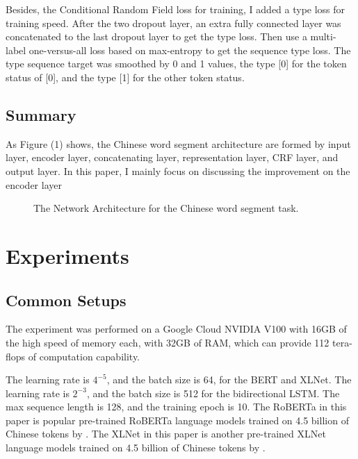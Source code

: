 \documentclass[11pt,a4paper]{article}
\begin{document}
Besides, the Conditional Random Field loss for training, I added a type loss for training speed.
After the two dropout layer, an extra fully connected layer was concatenated to the last dropout layer to get the type loss.
Then use a multi-label one-versus-all loss based on max-entropy to get the sequence type loss.
The type sequence target was smoothed by 0 and 1 values, the type [0] for the token status of [0], and the type [1] for the other token status.

\subsection{Summary}

As Figure (1) shows, the Chinese word segment architecture are formed by input layer, encoder layer, concatenating layer, representation layer, CRF layer, and output layer.
In this paper, I mainly focus on discussing the improvement on the encoder layer
\begin{figure*}
\begin{center}
\end{center}
   \caption{The Network Architecture for the Chinese word segment task.}
\label{fig:short}
\end{figure*}

\section{Experiments}

\subsection{Common Setups}

\par The experiment was performed on a Google Cloud NVIDIA V100 with 16GB of the high speed of memory each, with 32GB of RAM,
which can provide 112 tera-flops of computation capability.

The learning rate is $4^{-5}$, and the batch size is 64, for the BERT and XLNet.
The learning rate is $2^{-3}$, and the batch size is 512 for the bidirectional LSTM.
The max sequence length is 128, and the training epoch is 10.
The RoBERTa in this paper is popular pre-trained RoBERTa language models trained on 4.5 billion of Chinese tokens by \citet{cui2020revisiting}.
The XLNet in this paper is another pre-trained XLNet language models trained on 4.5 billion of Chinese tokens by \citet{cui2020revisiting}.
\end{document}
